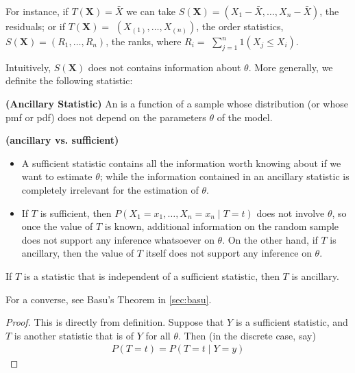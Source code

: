 \documentclass{article}
\newcommand{\bfs}[1]{\textbf{({#1}) }}
\begin{document}
\begin{exma}
  For instance, if $T(\mathbf{X})=\bar{X}$ we can take $S(\mathbf{X})=\left(X_{1}-\bar{X}, \ldots, X_{n}-\bar{X}\right)$, the residuals; or if $T(\mathbf{X})=$ $\left(X_{(1)}, \ldots, X_{(n)}\right)$, the order statistics, $S(\mathbf{X})=\left(R_{1}, \ldots, R_{n}\right)$, the ranks, where $R_{i}=$ $\sum_{j=1}^{n} 1\left(X_{j} \leq X_{i}\right)$.
\end{exma}
Intuitively, $ S(\mathbf{X})$ does not contains information about $\theta$. More generally, we definite the following statistic:
\begin{defa}\bfs{Ancillary Statistic}
An  is a function of a sample whose distribution (or whose pmf or pdf) does not depend on the parameters $\theta$ of the model.
\end{defa}
\begin{rema}\bfs{ancillary vs. sufficient}
\begin{itemize}
    \item A sufficient statistic contains all the information worth knowing about if we want to estimate $\theta$; while the information contained in an ancillary statistic is completely irrelevant for the estimation of $\theta$.
    \item If $T$ is sufficient, then $P\left(X_{1}=x_{1}, \ldots, X_{n}=x_{n} \mid T=t\right)$ does not involve $\theta$, so once the value of $T$ is known, additional information on the random sample does not support any inference whatsoever on $\theta$. On the other hand, if $T$ is ancillary, then the value of $T$ itself does not support any inference on $\theta$.
\end{itemize}
\end{rema}
\begin{lema}
If $T$ is a statistic that is independent of a sufficient statistic, then $T$ is ancillary.
\end{lema}
\begin{rema}
For a converse, see {Basu's Theorem} in \cref{sec:basu}.
\end{rema}
\begin{proof}
  This is directly from definition. Suppose that $Y$ is a sufficient statistic, and $T$ is another statistic that is  of $Y$ for all $\theta$. Then (in the discrete case, say)
\begin{align*}
P(T=t)=P(T=t \mid Y=y)
\end{align*}
\end{proof}
\end{document}

